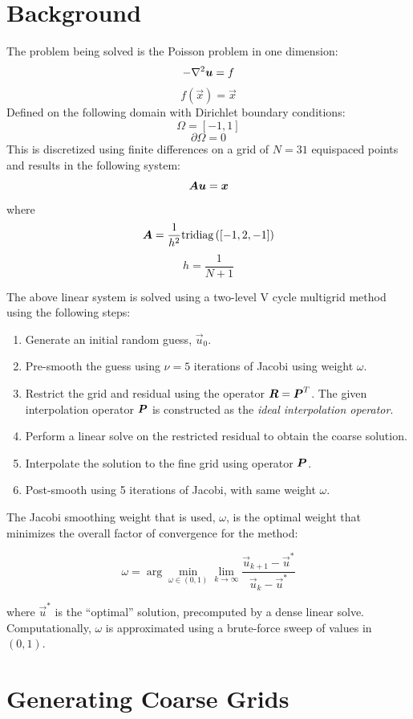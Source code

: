 


\section{Background}
The problem being solved is the Poisson problem in one dimension:
$$ -\nabla^2\bm{{u}} = f $$
$$ f(\vec{x}) = \vec{x} $$
Defined on the following domain with Dirichlet boundary conditions:
$$ \Omega = \left[-1, 1\right]$$
$$ \partial\Omega = 0 $$
This is discretized using finite differences on a grid of $N=31$ equispaced points and results in the following system:
$$ \bm{{A}}\bm{{u}} = \bm{{x}} $$
where
$$\bm{{A}} = \frac{1}{h^2} \text{tridiag}\left(\left[-1, 2, -1\right]\right)$$
$$h = \frac{1}{N+1}$$

The above linear system is solved using a two-level V cycle multigrid method using the following steps:

\begin{enumerate}
\item Generate an initial random guess, $\vec{u}_0$.
\item Pre-smooth the guess using $\nu=5$ iterations of Jacobi using weight $\omega$.
\item Restrict the grid and residual using the operator $\bm{{R}}=\bm{{P}}^T$.  The given interpolation operator $\bm{{P}}$ is constructed as the \textit{ideal interpolation operator}.
\item Perform a linear solve on the restricted residual to obtain the coarse solution.
\item Interpolate the solution to the fine grid using operator $\bm{{P}}$.
\item Post-smooth using 5 iterations of Jacobi, with same weight $\omega$.
\end{enumerate}

The Jacobi smoothing weight that is used, $\omega$, is the optimal weight that minimizes the overall factor of convergence for the method:

$$\omega = \arg \min_{\omega\in\left(0,1\right)} \lim_{k\to\infty} \frac{ \vec{u}_{k+1} - \vec{u}^* }{ \vec{u}_{k} - \vec{u}^* }$$

where $\vec{u}^*$ is the ``optimal'' solution, precomputed by a dense linear solve.  Computationally, $\omega$ is approximated using a brute-force sweep of values in $\left(0, 1\right) $.

\section{Generating Coarse Grids}

